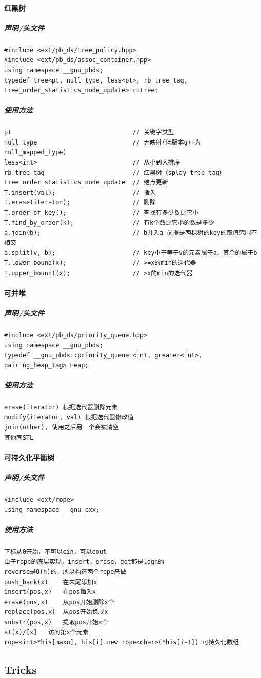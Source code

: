 \documentclass[twoside]{article}
\begin{document}
\paragraph{红黑树}
\subparagraph{声明/头文件}
\begin{lstlisting}
#include <ext/pb_ds/tree_policy.hpp>
#include <ext/pb_ds/assoc_container.hpp>
using namespace __gnu_pbds;
typedef tree<pt, null_type, less<pt>, rb_tree_tag, tree_order_statistics_node_update> rbtree;
\end{lstlisting}
\subparagraph{使用方法}
\begin{lstlisting}
pt                                 // 关键字类型
null_type                          // 无映射(低版本g++为null_mapped_type)
less<int>                          // 从小到大排序
rb_tree_tag                        // 红黑树（splay_tree_tag）
tree_order_statistics_node_update  // 结点更新
T.insert(val);                     // 插入
T.erase(iterator);                 // 删除
T.order_of_key();                  // 查找有多少数比它小
T.find_by_order(k);                // 有k个数比它小的数是多少
a.join(b);                         // b并入a 前提是两棵树的key的取值范围不相交
a.split(v, b);                     // key小于等于v的元素属于a，其余的属于b
T.lower_bound(x);                  // >=x的min的迭代器
T.upper_bound((x);                 // >x的min的迭代器
\end{lstlisting}
\paragraph{可并堆}
\subparagraph{声明/头文件}
\begin{lstlisting}
#include <ext/pb_ds/priority_queue.hpp>
using namespace __gnu_pbds;
typedef __gnu_pbds::priority_queue <int, greater<int>, pairing_heap_tag> Heap;
\end{lstlisting}
\subparagraph{使用方法}
\begin{lstlisting}
erase(iterator) 根据迭代器删除元素
modify(iterator, val) 根据迭代器修改值
join(other), 使用之后另一个会被清空
其他同STL
\end{lstlisting}
\paragraph{可持久化平衡树}
\subparagraph{声明/头文件}
\begin{lstlisting}
#include <ext/rope>
using namespace __gnu_cxx;
\end{lstlisting}
\subparagraph{使用方法}
\begin{lstlisting}
下标从0开始，不可以cin，可以cout
由于rope的底层实现，insert，erase，get都是logn的
reverse是O(n)的，所以构造两个rope来做
push_back(x)    在末尾添加x
insert(pos,x)   在pos插入x
erase(pos,x)    从pos开始删除x个
replace(pos,x)  从pos开始换成x
substr(pos,x)   提取pos开始x个
at(x)/[x]   访问第x个元素
rope<int>*his[maxn], his[i]=new rope<char>(*his[i-1]) 可持久化数组
\end{lstlisting}\subsection{Tricks}
\end{document}
